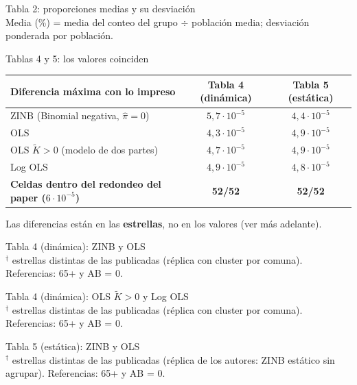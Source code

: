 \documentclass[aspectratio=169,10pt,t]{beamer}
\begin{document}
\begin{frame}{Tabla 2: proporciones medias y su desviación}
  \centering\footnotesize
  \\[2pt]
  \footnotesize Media (\%) = media del conteo del grupo $\div$ población media; desviación ponderada por población.
\end{frame}

\begin{frame}{Tablas 4 y 5: los valores coinciden}
  \centering\small
  \begin{tabular}{lcc}\toprule
    Diferencia máxima con lo impreso & Tabla 4 (dinámica) & Tabla 5 (estática) \\\midrule
    ZINB (Binomial negativa, $\hat\pi=0$) & $5{,}7\cdot10^{-5}$ & $4{,}4\cdot10^{-5}$ \\
    OLS & $4{,}3\cdot10^{-5}$ & $4{,}9\cdot10^{-5}$ \\
    OLS $\tilde K>0$ (modelo de dos partes) & $4{,}7\cdot10^{-5}$ & $4{,}9\cdot10^{-5}$ \\
    Log OLS & $4{,}9\cdot10^{-5}$ & $4{,}8\cdot10^{-5}$ \\\midrule
    \textbf{Celdas dentro del redondeo del paper ($6\cdot10^{-5}$)} & \textbf{52/52} & \textbf{52/52} \\\bottomrule
  \end{tabular}

  \vspace{6pt}
  \footnotesize Las diferencias están en las \textbf{estrellas}, no en los valores (ver más adelante).
\end{frame}

\begin{frame}{Tabla 4 (dinámica): ZINB y OLS}
  \centering\small
  \\[2pt]
  \scriptsize $^{\dagger}$ estrellas distintas de las publicadas (réplica con cluster por comuna). Referencias: 65+ y AB = 0.
\end{frame}

\begin{frame}{Tabla 4 (dinámica): OLS $\tilde K>0$ y Log OLS}
  \centering\small
  \\[2pt]
  \scriptsize $^{\dagger}$ estrellas distintas de las publicadas (réplica con cluster por comuna). Referencias: 65+ y AB = 0.
\end{frame}

\begin{frame}{Tabla 5 (estática): ZINB y OLS}
  \centering\small
  \\[2pt]
  \scriptsize $^{\dagger}$ estrellas distintas de las publicadas (réplica de los autores: ZINB estático sin agrupar). Referencias: 65+ y AB = 0.
\end{frame}
\end{document}
